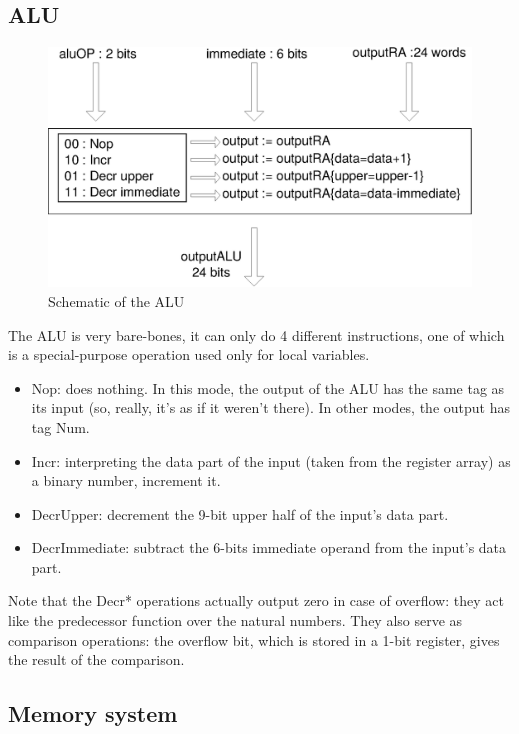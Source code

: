 \documentclass[a4paper, 11pt]{article}
\begin{document}
\subsection{ALU}
\begin{figure}[h]
\center
\caption{Schematic of the ALU}
   \includegraphics[scale=0.5]{ALU.eps}
\end{figure}

The ALU is very bare-bones, it can only do 4 different instructions, one of which is a special-purpose operation used only for local variables.
\begin{itemize}
\item Nop: does nothing. In this mode, the output of the ALU has the same tag as its input (so, really, it's as if it weren't there). In other modes, the output has tag Num.
\item Incr: interpreting the data part of the input (taken from the register array) as a binary number, increment it.
\item DecrUpper: decrement the 9-bit upper half of the input's data part.
\item DecrImmediate: subtract the 6-bits immediate operand from the input's data part.
\end{itemize}
Note that the Decr* operations actually output zero in case of overflow: they act like the predecessor function over the natural numbers. They also serve as comparison operations: the overflow bit, which is stored in a 1-bit register, gives the result of the comparison.

\newpage
\subsection{Memory system}
\end{document}
